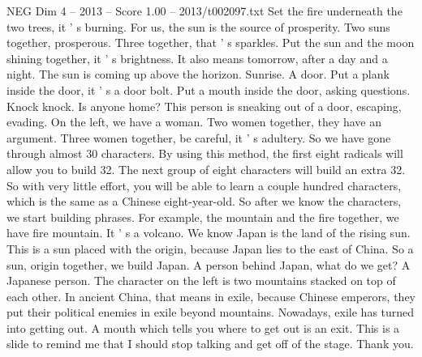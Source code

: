 \begin{textsample}{NEG Dim 4 – 2013 – Score 1.00 – 2013/t002097.txt}
Set the fire underneath the two trees, it ' s burning.
For us, the sun is the source of prosperity.
Two suns together, prosperous.
Three together, that ' s sparkles.
Put the sun and the moon shining together, it ' s brightness.
It also means tomorrow, after a day and a night.
The sun is coming up above the horizon.
Sunrise.
A door.
Put a plank inside the door, it ' s a door bolt.
Put a mouth inside the door, asking questions.
Knock knock.
Is anyone home?
This person is sneaking out of a door, escaping, evading.
On the left, we have a woman.
Two women together, they have an argument.
Three women together, be careful, it ' s adultery.
So we have gone through almost 30 characters.
By using this method, the first eight radicals will allow you to build 32.
The next group of eight characters will build an extra 32.
So with very little effort, you will be able to learn a couple hundred characters, which is the same as a Chinese eight-year-old.
So after we know the characters, we start building phrases.
For example, the mountain and the fire together, we have fire mountain.
It ' s a volcano.
We know Japan is the land of the rising sun.
This is a sun placed with the origin, because Japan lies to the east of China.
So a sun, origin together, we build Japan.
A person behind Japan, what do we get?
A Japanese person.
The character on the left is two mountains stacked on top of each other.
In ancient China, that means in exile, because Chinese emperors, they put their political enemies in exile beyond mountains.
Nowadays, exile has turned into getting out.
A mouth which tells you where to get out is an exit.
This is a slide to remind me that I should stop talking and get off of the stage.
Thank you.

\end{textsample}
